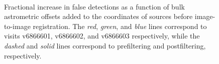 \documentclass[prd, nofootinbib, floatfix, 11pt,tightenlines,times]{article}
\begin{document}
{\begin{figure}
 \\
\caption{Fractional increase in false detections as a function of bulk
  astrometric offsets added to the coordinates of sources before
  image-to-image registration.  The {\it red}, {\it green}, and {\it
    blue} lines correspond to visits v6866601, v6866602, and v6866603
  respectively, while the {\it dashed} and {\it solid} lines
  correspond to prefiltering and postfiltering, respectively.}
\label{wcsshift}
\end{figure}

}
\end{document}
